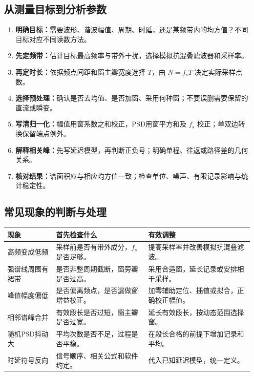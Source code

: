 \subsection*{从测量目标到分析参数}
\begin{enumerate}
\item \textbf{明确目标：}需要波形、谐波幅值、周期、时延，还是某频带内的均方值？不同目标对应不同读数方法。
\item \textbf{先定频带：}估计目标最高频率与带外干扰，选择模拟抗混叠滤波器和采样率。
\item \textbf{再定时长：}依据频点间距和窗主瓣宽度选择 $T$，由 $N=f_sT$ 决定实际采样点数。
\item \textbf{选择预处理：}确认是否去均值、是否加窗、采用何种窗；不要误删需要保留的直流或瞬变。
\item \textbf{写清归一化：}幅值用窗系数之和校正，PSD用窗平方和及 $f_s$ 校正；单双边转换保留端点例外。
\item \textbf{解释相关峰：}先写延迟模型，再判断正负号；明确单程、往返或路径差的几何关系。
\item \textbf{核对结果：}谱面积应与相应均方值一致；检查单位、噪声、有限记录影响与统计稳定性。
\end{enumerate}

\Needspace{7cm}
\subsection*{常见现象的判断与处理}
\begin{table}[H]
\centering\small
\begin{tabularx}{\linewidth}{@{}p{2.5cm} X X@{}}
\toprule
现象 & 首先检查什么 & 有效调整 \\
\midrule
高频变成低频 & 采样前是否有带外成分，$f_s$ 是否足够。 & 提高采样率并改善模拟抗混叠滤波。 \\
强谱线周围有裙带 & 是否非整周期截断，窗旁瓣是否过高。 & 采用合适窗，延长记录或安排相干采样。 \\
峰值幅度偏低 & 是否偏离频点，是否漏做窗增益校正。 & 加零辅助定位、插值或拟合，正确校正幅值。 \\
相邻谱峰合并 & 有效段长是否过短，窗主瓣是否过宽。 & 延长有效段长，按动态范围选择窗。 \\
随机PSD抖动大 & 平均次数是否不足，过程是否平稳。 & 在段长合格的前提下增加记录和平均。 \\
时延符号反向 & 信号顺序、相关公式和软件约定。 & 代入已知延迟模型，统一定义。 \\
\bottomrule
\end{tabularx}
\end{table}


